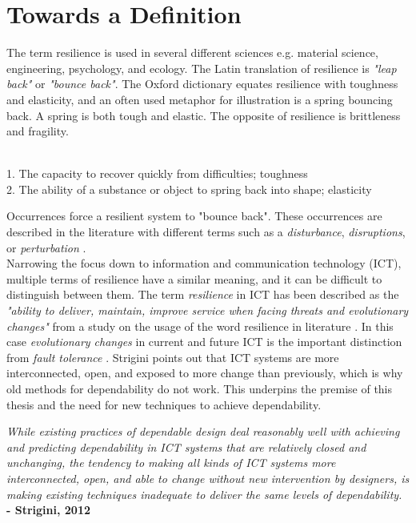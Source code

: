 \section{Towards a Definition}\label{sec_resilience_definitions}
The term resilience is used in several different sciences e.g. material science, engineering, psychology, and ecology. The Latin translation of resilience is \textit{"leap back"} or \textit{"bounce back"}. The Oxford dictionary equates resilience with toughness and elasticity, and an often used metaphor for illustration is a spring bouncing back. A spring is both tough and elastic. The opposite of resilience is brittleness and fragility. \\

\begin{definition} 
\ \\
1. The capacity to recover quickly from difficulties; toughness \\
2. The ability of a substance or object to spring back into shape; elasticity
\end{definition}

\noindent
Occurrences force a resilient system to "bounce back". These occurrences are described in the literature with different terms such as a \textit{disturbance}, \textit{disruptions}, or \textit{perturbation} \cite[p. 13, 14, 19]{omer2013resilience}.\\

\noindent 
Narrowing the focus down to information and communication technology (ICT), multiple terms of resilience have a similar meaning, and it can be difficult to distinguish between them. The term \textit{resilience} in ICT has been described as the \textit{"ability to deliver, maintain, improve service when facing threats and evolutionary changes"} from a study on the usage of the word resilience in literature \cite[p. 27]{resist2007openworkshop}. In this case \textit{evolutionary changes} in current and future ICT is the important distinction from \textit{fault tolerance} \cite[p. 4]{strigini2012ftresilience}. Strigini points out that ICT systems are more interconnected, open, and exposed to more change than previously, which is why old methods for dependability do not work. This underpins the premise of this thesis and the need for new techniques to achieve dependability.

\begin{citat} []
\textit{While existing practices of dependable design deal reasonably well with achieving and predicting dependability in ICT systems that are relatively closed and unchanging, the tendency to making all kinds of ICT systems more interconnected, open, and able to change without new intervention by designers, is making existing techniques inadequate to deliver the same levels of dependability.} \textbf{- Strigini, 2012} \cite[p. 4-5]{strigini2012ftresilience}
\end{citat}

